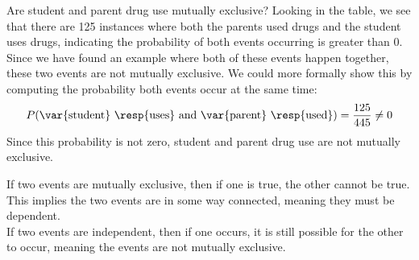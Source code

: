 
\begin{example}{Are student and parent drug use mutually exclusive?}
Looking in the table, we see that there are 125 instances where both the parents used drugs and the student uses drugs, indicating the probability of both events occurring is greater than 0. Since we have found an example where both of these events happen together, these two events are not mutually exclusive. We could more formally show this by computing the probability both events occur at the same time:
\begin{align*}
P(\text{\var{student} \resp{uses} and \var{parent} \resp{used}}) = \frac{125}{445}\neq 0
\end{align*}
Since this probability is not zero, student and parent drug use are not mutually exclusive.
\end{example}

\begin{tipBox}{
If two events are mutually exclusive, then if one is true, the other cannot be true. This implies the two events are in some way connected, meaning they must be dependent.\\
If two events are independent, then if one occurs, it is still possible for the other to occur, meaning the events are not mutually exclusive.}
\end{tipBox}

